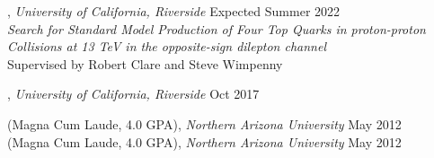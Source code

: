 , \textit{University of California, Riverside} \hfill Expected Summer 2022\\
\textit{Search for Standard Model Production of Four Top Quarks in proton-proton Collisions at 13 TeV in the opposite-sign dilepton channel}\\
Supervised by Robert Clare and Steve Wimpenny

, \textit{University of California, Riverside}	\hfill Oct 2017

(Magna Cum Laude, 4.0 GPA), \textit{Northern Arizona University} \hfill	May 2012\\
(Magna Cum Laude, 4.0 GPA), \textit{Northern Arizona University} \hfill	May 2012\\



